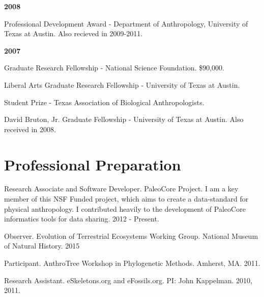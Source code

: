 \documentclass{article}
\begin{document}
\begin{description*}
\item[] {\bfseries 2008}
\item[] Professional Development Award - Department of Anthropology, University of Texas at Austin. Also recieved in 2009-2011.
\end{description*}

\begin{description*}
\item[] {\bfseries 2007}
\item[] Graduate Research Fellowship - National Science Foundation. \$90,000.

\item[] Liberal Arts Graduate Research Fellowship - University of Texas at Austin.

\item[] Student Prize - Texas Association of Biological Anthropologists.

\item[] David Bruton, Jr. Graduate Fellowship - University of Texas at Austin. Also received in 2008.
\end{description*}

\section*{Professional Preparation}
\begin{description*}

\item[] Research Associate and Software Developer. PaleoCore Project. I am a key member of this NSF Funded project, which aims to create a data-standard for physical anthropology. I contributed heavily to the development of PaleoCore informatics tools for data sharing. 2012 - Present.

\item[] Observer. Evolution of Terrestrial Ecosystems Working Group. National Museum of Natural History. 2015

\item[] Participant. AnthroTree Workshop in Phylogenetic Methods. Amherst, MA. 2011.

\item[] Research Assistant. eSkeletons.org and eFossils.org. PI: John Kappelman. 2010, 2011.

\end{description*}
\end{document}
